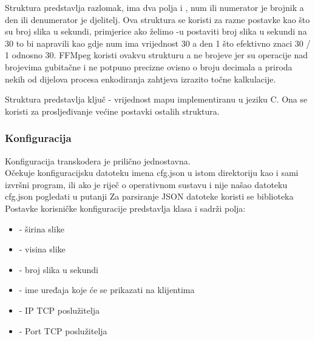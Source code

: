  \label{sec:av_rational}
Struktura  predstavlja razlomak, ima dva polja  i , num ili numerator
je brojnik a den ili denumerator je djelitelj.
\paraBreak
Ova struktura se koristi za razne postavke kao što su broj slika u sekundi, primjerice ako želimo -u
postaviti broj slika u sekundi na 30 to bi napravili kao  gdje num ima vrijednost 30 a den 1 što efektivno
znaci 30 / 1 odnosno 30.
\paraBreak
FFMpeg koristi ovakvu strukturu a ne  brojeve jer su operacije nad  brojevima gubitačne
i ne potpuno precizne ovisno o broju decimala a priroda nekih od dijelova procesa enkodiranja zahtjeva izrazito 
točne kalkulacije. \cite{ffmpegDocs}

Struktura  predstavlja ključ - vrijednost mapu implementiranu u jeziku C. Ona se koristi za
prosljeđivanje većine postavki ostalih struktura.

\clearpage
\subsubsection{Konfiguracija}\label{sec:configuration}
Konfiguracija transkodera je prilično jednostavna. \\
Očekuje konfiguracijsku  datoteku imena cfg.json u istom direktoriju kao i sami izvršni program, ili ako je
riječ o operativnom sustavu  i nije našao datoteku cfg.json pogledati u putanji 
\paraBreak
Za parsiranje JSON datoteke koristi se biblioteka  \cite{nlohmanJson}
\paraBreak
Postavke korisničke konfiguracije predstavlja klasa  i sadrži polja:
\begin{itemize}
  \item {} - širina slike
  \item {} - visina slike
  \item {} - broj slika u sekundi
  \item {} - ime uređaja koje će se prikazati na klijentima
  \item {} - IP TCP poslužitelja
  \item {} - Port TCP poslužitelja
\end{itemize}

